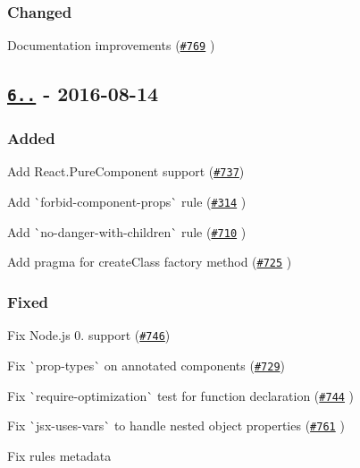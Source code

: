 \subsubsection*{Changed}


\begin{DoxyItemize}
\item Documentation improvements (\href{https://github.com/yannickcr/eslint-plugin-react/pull/769}{\tt \#769} )
\end{DoxyItemize}

\subsection*{\href{https://github.com/yannickcr/eslint-plugin-react/compare/v6.0.0...v6.1.0}{\tt 6..} -\/ 2016-\/08-\/14}

\subsubsection*{Added}


\begin{DoxyItemize}
\item Add {\ttfamily React.\+Pure\+Component} support (\href{https://github.com/yannickcr/eslint-plugin-react/issues/737}{\tt \#737})
\item Add \`{}forbid-\/component-\/props\`{} rule (\href{https://github.com/yannickcr/eslint-plugin-react/pull/314}{\tt \#314} )
\item Add \`{}no-\/danger-\/with-\/children\`{} rule (\href{https://github.com/yannickcr/eslint-plugin-react/issues/710}{\tt \#710} )
\item Add pragma for {\ttfamily create\+Class} factory method (\href{https://github.com/yannickcr/eslint-plugin-react/pull/725}{\tt \#725} )
\end{DoxyItemize}

\subsubsection*{Fixed}


\begin{DoxyItemize}
\item Fix Node.\+js 0. support (\href{https://github.com/yannickcr/eslint-plugin-react/issues/746}{\tt \#746})
\item Fix \`{}prop-\/types\`{} on annotated components (\href{https://github.com/yannickcr/eslint-plugin-react/issues/729}{\tt \#729})
\item Fix \`{}require-\/optimization\`{} test for function declaration (\href{https://github.com/yannickcr/eslint-plugin-react/pull/744}{\tt \#744} )
\item Fix \`{}jsx-\/uses-\/vars\`{} to handle nested object properties (\href{https://github.com/yannickcr/eslint-plugin-react/pull/761}{\tt \#761} )
\item Fix rules metadata
\end{DoxyItemize}

